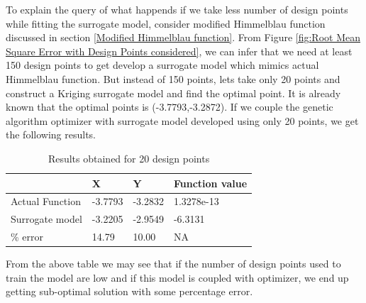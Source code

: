To explain the query of what happends if we take less number of design points while fitting the surrogate model, consider modified Himmelblau function discussed in section \ref{Modified Himmelblau function}. From Figure \ref{fig:Root Mean Square Error with Design Points considered}, we can infer that we need at least 150 design points to get develop a surrogate model which mimics actual Himmelblau function. But instead of 150 points, lets take only 20 points and construct a Kriging surrogate model and find the optimal point. It is already known that the optimal points is  (-3.7793,-3.2872). If we couple the genetic algorithm optimizer with surrogate model developed using only 20 points, we get the following results.
\begin{table}[H]
	\centering
	\caption{Results obtained for 20 design points}
	\label{Results obtained for 20 design points}
	\begin{tabular}{llll}
		\hline \hline
		& X & Y & Function value \\ \hline
		Actual Function & -3.7793 &-3.2832 &1.3278e-13 \\
		Surrogate model & -3.2205 &-2.9549 & -6.3131 \\ \hline
		\% error & 14.79 & 10.00 & NA \\
		\hline \hline
	\end{tabular}
\end{table}
From the above table we may see that if the number of design points used to train the model are low and if this model is coupled with optimizer, we end up getting sub-optimal solution with some percentage error.







